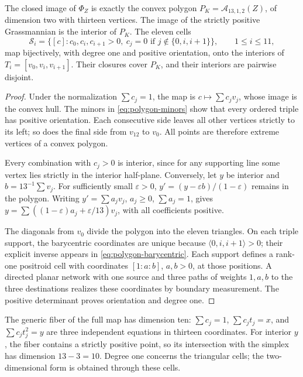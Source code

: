 \begin{theorem}
\label{thm:polygon-amplituhedron}
The closed image of \(\Phi_Z\) is exactly the convex polygon
\(P_K=\mathcal A_{13,1,2}(Z)\), of dimension two with thirteen
vertices. The image of the strictly positive Grassmannian is the
interior of \(P_K\). The eleven cells
\begin{equation}
 \mathcal S_i=\{[c]:c_0,c_i,c_{i+1}>0,\
 c_j=0\text{ if }j\notin\{0,i,i+1\}\},\qquad 1\leq i\leq11,
 \label{eq:polygon-cells}
\end{equation}
map bijectively, with degree one and positive orientation, onto the
interiors of \(T_i=[v_0,v_i,v_{i+1}]\). Their closures cover \(P_K\),
and their interiors are pairwise disjoint.
\end{theorem}
\begin{proof}
Under the normalization \(\sum c_j=1\), the map is
\(c\mapsto\sum c_jv_j\), whose image is the convex hull.
The minors in \eqref{eq:polygon-minors} show that every ordered
triple has positive orientation. Each consecutive side leaves all
other vertices strictly to its left; so does the final side from
\(v_{12}\) to \(v_0\). All points are therefore extreme vertices
of a convex polygon.

Every combination with \(c_j>0\) is interior, since for any
supporting line some vertex lies strictly in the interior half-plane.
Conversely, let \(y\) be interior and \(b=13^{-1}\sum v_j\).
For sufficiently small \(\varepsilon>0\),
\(y'=(y-\varepsilon b)/(1-\varepsilon)\) remains in the polygon.
Writing \(y'=\sum a_jv_j\), \(a_j\geq0\), \(\sum a_j=1\), gives
\(y=\sum((1-\varepsilon)a_j+\varepsilon/13)v_j\), with all
coefficients positive.

The diagonals from \(v_0\) divide the polygon into the eleven
triangles. On each triple support, the barycentric coordinates are
unique because \(\langle0,i,i+1\rangle>0\); their explicit inverse
appears in \eqref{eq:polygon-barycentric}. Each support defines a
rank-one positroid cell with coordinates \([1:a:b]\), \(a,b>0\),
at those positions. A directed planar network with one source and
three paths of weights \(1,a,b\) to the three destinations realizes
these coordinates by boundary measurement. The positive determinant
proves orientation and degree one.
\end{proof}

The generic fiber of the full map has dimension ten:
\(\sum c_j=1\), \(\sum c_jt_j=x\), and \(\sum c_jt_j^2=y\)
are three independent equations in thirteen coordinates.
For interior \(y\), the fiber contains a strictly positive point,
so its intersection with the simplex has dimension \(13-3=10\).
Degree one concerns the triangular cells; the two-dimensional form
is obtained through these cells.

